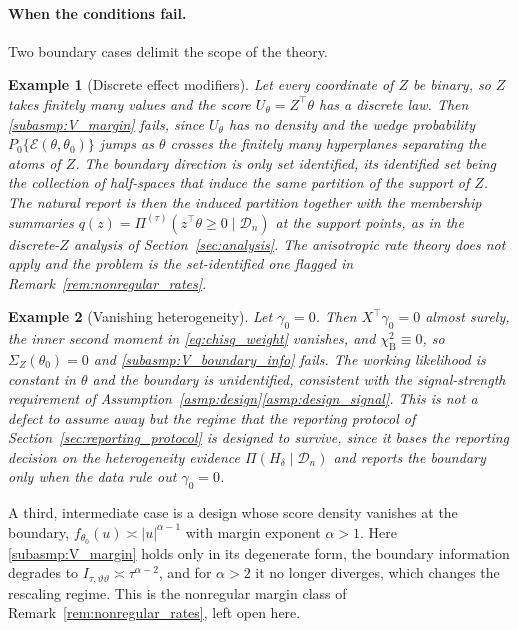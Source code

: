 \documentclass[11pt]{article}
\newtheorem{example}{Example}
\theoremstyle{definition}
\theoremstyle{plain}
\begin{document}
\paragraph{When the conditions fail.} Two boundary cases delimit the scope of the theory.

\begin{example}[Discrete effect modifiers]
Let every coordinate of $Z$ be binary, so $Z$ takes finitely many values and the score $U_\theta=Z^\top\theta$ has a discrete law. Then \ref{subasmp:V_margin} fails, since $U_\theta$ has no density and the wedge probability $P_0\{\mathcal E(\theta,\theta_0)\}$ jumps as $\theta$ crosses the finitely many hyperplanes separating the atoms of $Z$. The boundary direction is only set identified, its identified set being the collection of half-spaces that induce the same partition of the support of $Z$. The natural report is then the induced partition together with the membership summaries $q(z)=\Pi^{(\tau)}(z^\top\theta\ge0\mid\mathcal D_n)$ at the support points, as in the discrete-$Z$ analysis of Section~\ref{sec:analysis}. The anisotropic rate theory does not apply and the problem is the set-identified one flagged in Remark~\ref{rem:nonregular_rates}.
\end{example}

\begin{example}[Vanishing heterogeneity]
Let $\gamma_0=0$. Then $X^\top\gamma_0=0$ almost surely, the inner second moment in \eqref{eq:chisq_weight} vanishes, and $\chi^2_{\mathrm B}\equiv0$, so $\Sigma_Z(\theta_0)=0$ and \ref{subasmp:V_boundary_info} fails. The working likelihood is constant in $\theta$ and the boundary is unidentified, consistent with the signal-strength requirement of Assumption~\ref{asmp:design}\ref{asmp:design_signal}. This is not a defect to assume away but the regime that the reporting protocol of Section~\ref{sec:reporting_protocol} is designed to survive, since it bases the reporting decision on the heterogeneity evidence $\Pi(H_\delta\mid\mathcal D_n)$ and reports the boundary only when the data rule out $\gamma_0=0$.
\end{example}

A third, intermediate case is a design whose score density vanishes at the boundary, $f_{\theta_0}(u)\asymp|u|^{\alpha-1}$ with margin exponent $\alpha>1$. Here \ref{subasmp:V_margin} holds only in its degenerate form, the boundary information degrades to $I_{\tau,\vartheta\vartheta}\asymp\tau^{\alpha-2}$, and for $\alpha>2$ it no longer diverges, which changes the rescaling regime. This is the nonregular margin class of Remark~\ref{rem:nonregular_rates}, left open here.
\end{document}
